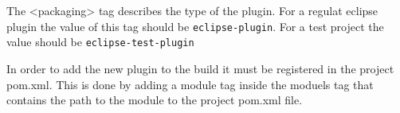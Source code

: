 \documentclass[a4paper]{article}
\begin{document}
The <packaging> tag describes the type of the plugin. For a regulat eclipse plugin the value of this tag should be \texttt{eclipse-plugin}. For a test project
the value should be \texttt{eclipse-test-plugin}


In order to add the new plugin to the build it must be registered in the project pom.xml. This is done by adding a module tag inside the moduels tag that contains
the path to the module to  the project pom.xml file.

\end{document}
